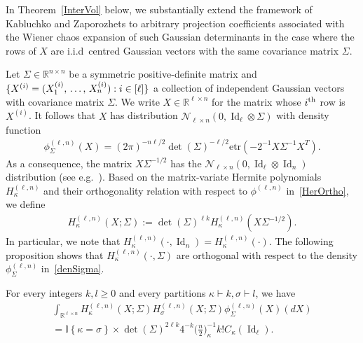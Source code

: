 \documentclass[10pt]{amsart}
\theoremstyle{definition}\newtheorem{defi}[theo]{Definition}\newtheorem{rema}[theo]{Remark}\newtheorem{exam}[theo]{Example}\newtheorem{exem}[theo]{Example}\newtheorem{nota}[theo]{Notation}
\DeclareMathOperator{\Id}{Id}
\newcommand{\clN}{\mathcal{N}}
\newcommand{\R}{\mathbb{R}}
\newcommand{\ind}[1]{\mathbb{I}
\left\{#1\right\}}
\newcommand{\etr}[1]{\mathrm{etr}\left(#1\right)}
\begin{document}
In Theorem~\ref{InterVol} below, we substantially extend the framework of Kabluchko and Zaporozhets to arbitrary projection coefficients associated with the Wiener chaos expansion of such Gaussian determinants in the case where the rows of $X$ are i.i.d~centred Gaussian vectors with the same covariance matrix $\Sigma$.

Let $\Sigma \in \R^{n \times n}$ be a symmetric positive-definite matrix and $\{X^{(i)}=(X_1^{(i)},\,\ldots,\,X_n^{(i)})\linebreak :i \in [\ell]\}$ a collection of independent Gaussian vectors with covariance matrix $\Sigma$. We write $X \in \R^{\ell \times n}$ for the matrix whose $i^{\rm th}$ row is $X^{(i)}$. It follows that $X$ has distribution $ \clN_{\ell\times n}(0,\Id_{\ell} \otimes \Sigma)$ with density function
\begin{gather}\label{denSigma}
\phi^{(\ell,n)}_{\Sigma}(X) = (2\pi)^{-n\ell/2} \det(\Sigma)^{-\ell/2} \etr{- 2^{-1}X\Sigma^{-1}X^T}.
\end{gather}
As a consequence, the matrix $X\Sigma^{-1/2}$ has the $\clN_{\ell\times n}(0,\Id_{\ell} \otimes \Id_n)$ distribution (see e.g.~\cite[Theorem~2.3.10]{Gupta2018}). Based on the matrix-variate Hermite polynomials $H_{\kappa}^{(\ell,n)}$ and their orthogonality relation with respect to $\phi^{(\ell,n)}$ in~\eqref{HerOrtho}, we define
\begin{gather}\label{HerSigma}
H^{(\ell,n)}_{\kappa}(X; \Sigma) := \det(\Sigma)^{\ell k} H_{\kappa}^{(\ell,n)}\left(X\Sigma^{-1/2}\right).
\end{gather}
In particular, we note that $H_{\kappa}^{(\ell,n)}(\cdot, \Id_n)=H_{\kappa}^{(\ell,n)}(\cdot)$. The following proposition shows that $H^{(\ell,n)}_{\kappa}(\cdot, \Sigma)$ are orthogonal with respect to the density $\phi^{(\ell,n)}_{\Sigma}$ in~\eqref{denSigma}.

\begin{prop}\label{DefSigma}
For every integers $k,l\geq0$ and every partitions $\kappa \vdash k, \sigma \vdash l$, we have
\begin{multline*}
\int_{\R^{\ell \times n}} H^{(\ell,n)}_{\kappa}(X;\Sigma) H^{(\ell,n)}_{\sigma}(X;\Sigma) \phi^{(\ell,n)}_{\Sigma}(X)(dX)
\\
= \ind{\kappa=\sigma} \times \det(\Sigma)^{2\ell k}4^{-k}\bigg(\frac{n}{2}\bigg)_{\kappa}^{-1} k!C_{\kappa}(\Id_{\ell}).
\end{multline*}
\end{prop}
\end{document}
